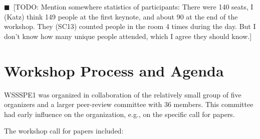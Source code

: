 \documentclass[11pt, oneside]{amsart}
\newcommand{\todo}[1]{{\color{blue}$\blacksquare$~\textsf{[TODO: #1]}}}
\begin{document}
\todo{Mention somewhere statistics of participants: There were 140 seats, I (Katz) think 149 people at the first keynote, and about 90 at the end of the workshop.  They (SC13) counted people in the room 4 times during the day.  But I don’t know how many unique people attended, which I agree they should know.}

\section{Workshop Process and Agenda} \label{sec:process}

WSSSPE1 was organized in collaboration of the relatively small group
of five organizers and a larger peer-review committee with 36
members. This committee had early influence on the organization, e.g.,
on the specific call for papers.

The workshop call for papers included:
\end{document}
